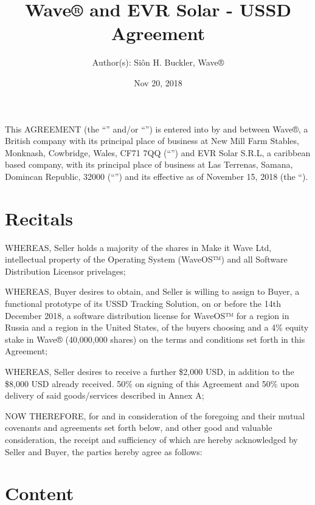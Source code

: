 \documentclass[letterpaper,10pt,english]{sphinxmanual}
\title{Wave® and EVR Solar - USSD Agreement}
\date{Nov 20, 2018}
\author{Author(s): Siôn H. Buckler, Wave®}
\begin{document}
\pagestyle{empty}
\maketitle
\pagestyle{plain}
\sphinxtableofcontents
\pagestyle{normal}
\label{\detokenize{index::doc}}


This AGREEMENT (the “” and/or “”) is entered into by and between Wave®, a British company with its principal place of business at New Mill Farm Stables, Monknash, Cowbridge, Wales, CF71 7QQ (“”)  and EVR Solar S.R.L, a caribbean based company, with its principal place of business at Las Terrenas, Samana, Domincan Republic, 32000  (“”) and its effective as of November 15, 2018 (the “).


\chapter{Recitals}
\label{\detokenize{index:recitals}}
WHEREAS, Seller holds a majority of the shares in Make it Wave Ltd, intellectual property of the Operating System (WaveOS™) and all Software Distribution Licensor privelages;

WHEREAS, Buyer desires to obtain, and Seller is willing to assign to Buyer, a functional prototype of its USSD Tracking Solution, on or before the 14th December 2018, a software distribution license for WaveOS™ for a region in Russia and a region in the United States, of the buyers choosing and a 4\% equity stake in Wave® (40,000,000 shares) on the terms and conditions set forth in this Agreement;

WHEREAS, Seller desires to receive a further \$2,000 USD, in addition to the \$8,000 USD already received. 50\% on signing of this Agreement and 50\% upon delivery of said goods/services described in Annex A;

NOW THEREFORE, for and in consideration of the foregoing and their mutual covenants and agreements set forth below, and other good and valuable consideration, the receipt and sufficiency of which are hereby acknowledged by Seller and Buyer, the parties hereby agree as follows:


\chapter{Content}
\label{\detokenize{index:content}}
\end{document}

